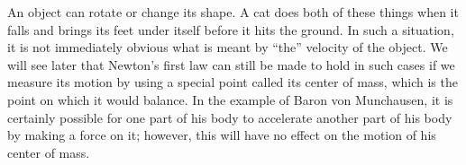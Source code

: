 An object can rotate or change its shape. A cat does both of these things when it falls and
brings its feet under itself before it hits the ground. In such a situation, it is not
immediately obvious what is meant by ``the'' velocity of the object. We will see later that
Newton's first law can still be made to hold in such cases if we measure its motion by using
a special point called its center of mass, which is the point on which it would balance.
In the example of Baron von Munchausen, it is certainly possible for one part of his body
to accelerate another part of his body by making a force on it; however, this will have
no effect on the motion of his center of mass.
